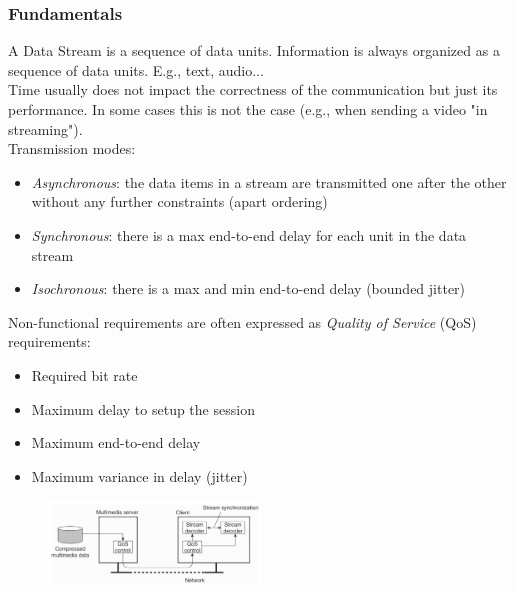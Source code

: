 \documentclass[10pt,a4paper]{article}
\begin{document}
\subsubsection{Fundamentals}
A Data Stream is a sequence of data units. Information is always organized as a sequence of data units. E.g., text, audio... \\
Time usually does not impact the correctness of the communication but just its performance. In some cases this is not the case (e.g., when sending a video "in streaming"). \\
Transmission modes:
\begin{itemize}
	\item \textit{Asynchronous}: the data items in a stream are transmitted one after the other without any further constraints (apart ordering)
	\item \textit{Synchronous}: there is a max end-to-end delay for each unit in the data stream
	\item \textit{Isochronous}: there is a max and min end-to-end delay (bounded jitter)
\end{itemize}
Non-functional requirements are often expressed as \textit{Quality of Service} (QoS) requirements:
\begin{itemize}
	\item Required bit rate
	\item Maximum delay to setup the session
	\item Maximum end-to-end delay
	\item Maximum variance in delay (jitter)
\end{itemize}
 \begin{figure}[h!]
 \hfill \includegraphics[width=160pt]{images/qos.png}\hspace*{\fill}
  \label{fig:qos}
\end{figure}
\end{document}
